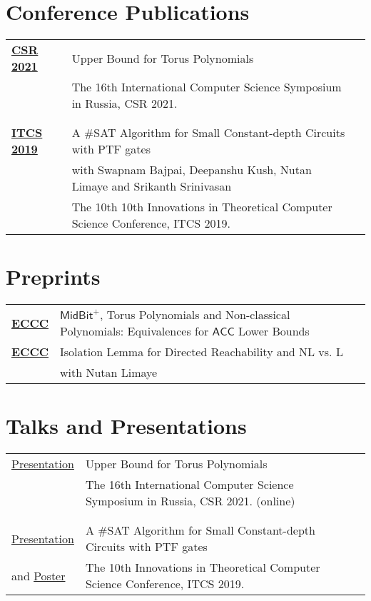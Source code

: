 \documentclass[a4paper,10pt]{article}
\begin{document}
\section{Conference Publications}

\begin{tabular}{p{2.5cm}|p{11cm}l}
  \href{https://link.springer.com/chapter/10.1007/978-3-030-79416-3_15}{{\bf CSR 2021}} & Upper Bound for Torus Polynomials \\
  & The 16th International Computer Science Symposium in Russia, CSR 2021. \\\multicolumn{2}{c}{} \\
  \\
  \href{https://drops.dagstuhl.de/opus/volltexte/2018/10101/}{{\bf ITCS 2019}} & A \#SAT Algorithm for Small Constant-depth Circuits with PTF gates \\
  & with Swapnam Bajpai, Deepanshu Kush, Nutan Limaye and Srikanth Srinivasan \\
  & The 10th 10th Innovations in Theoretical Computer Science Conference, ITCS 2019.
\end{tabular}

\section{Preprints}

\begin{tabular}{p{2.5cm}|p{11cm}l}
  \href{https://eccc.weizmann.ac.il/report/2023/111/}{{\bf ECCC}} & \(\mathsf{MidBit}^+\), Torus Polynomials and Non-classical Polynomials: Equivalences for \(\mathsf{ACC}\) Lower Bounds \\
  \href{https://eccc.weizmann.ac.il/report/2016/155/}{{\bf ECCC}} & Isolation Lemma for Directed Reachability and NL vs. L
  \\
  & with Nutan Limaye
\end{tabular}

\section{Talks and Presentations}

\begin{tabular}{p{2.5cm}|p{11cm}l}
  \href{https://vaibhkrishan.github.io/files/slides/torus.pdf}{Presentation} & Upper Bound for Torus Polynomials \\
  & The 16th International Computer Science Symposium in Russia, CSR 2021. (online) \\\multicolumn{2}{c}{} \\
  \\
  \href{https://vaibhkrishan.github.io/files/slides/ptf.pdf}{Presentation} & A \#SAT Algorithm for Small Constant-depth Circuits with PTF gates \\
  and \href{https://vaibhkrishan.github.io/files/slides/poster.pdf}{Poster} & The 10th Innovations in Theoretical Computer Science Conference, ITCS 2019.
\end{tabular}
\end{document}
